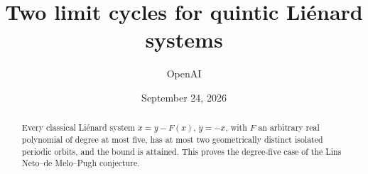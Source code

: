 \documentclass[11pt]{article}
\title{Two limit cycles for quintic Li\'enard systems}
\author{OpenAI}
\date{September 24, 2026}
\numberwithin{equation}{section}
\theoremstyle{remark}
\begin{document}
\maketitle
\begin{abstract}
Every classical Li\'enard system $\dot x=y-F(x)$, $\dot y=-x$,
with $F$ an arbitrary real polynomial of degree at most five,
has at most two geometrically distinct isolated periodic orbits,
and the bound is attained. This proves the degree-five case of the
Lins Neto--de Melo--Pugh conjecture.
\end{abstract}








\end{document}
